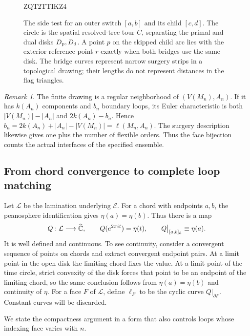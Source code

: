 \documentclass[11pt]{article}
\numberwithin{equation}{section}
\theoremstyle{definition}
\theoremstyle{remark}
\newtheorem{remark}[theorem]{Remark}
\newcommand{\1}{\mathbf 1}
\begin{document}
\begin{figure}[ht]

\begingroup
{}
ZQT2TTIKZ4
\endgroup

\caption{The side test for an outer switch $[a,b]$ and its child
$[c,d]$.  The circle is the spatial resolved-tree tour $C$, separating
the primal and dual disks $D_{\rm p},D_{\rm d}$.  A point $p$ on
the skipped child arc lies with the exterior reference point $r$
exactly when both bridges use the same disk.  The bridge curves
represent narrow surgery strips in a topological drawing; their
lengths do not represent distances in the flag triangles.}
\label{loop:surgery-sides-figure}
\end{figure}

\begin{remark}\label{loop:count}
The finite drawing is a regular neighborhood of $(V(M_n),A_n)$.
If it has $k(A_n)$ components and $b_n$ boundary loops, its Euler
characteristic is both $|V(M_n)|-|A_n|$ and $2k(A_n)-b_n$.  Hence
$b_n=2k(A_n)+|A_n|-|V(M_n)|=\ell(M_n,A_n)$.  The surgery description
likewise gives one plus the number of flexible orders.  Thus the face
bijection counts the actual interfaces of the specified ensemble.
\end{remark}

\subsection{From chord convergence to complete loop matching}

Let $\mathcal L$ be the lamination underlying $\mathcal E$.  For a chord
with endpoints $a,b$, the peanosphere identification gives
$\eta(a)=\eta(b)$.  Thus there is a map
\[
 Q:\mathcal L\longrightarrow\widehat{\mathbb C},
 \qquad Q(e^{2\pi it})=\eta(t),
 \qquad Q\big|_{[a,b]_{\rm d}}\equiv\eta(a).
\]
It is well defined and continuous.  To see continuity, consider a
convergent sequence of points on chords and extract convergent endpoint
pairs.  At a limit point in the open disk the limiting chord fixes the
value.  At a limit point of the time circle, strict convexity of the disk
forces that point to be an endpoint of the limiting chord, so the same
conclusion follows from $\eta(a)=\eta(b)$ and continuity of $\eta$.
For a face $F$ of $\mathcal L$, define $\ell_F$ to be the cyclic curve
$Q|_{\partial F}$.  Constant curves will be discarded.

We state the compactness argument in a form that also controls loops
whose indexing face varies with $n$.
\end{document}
